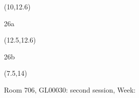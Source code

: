 \documentclass[a4paper]{article}
\newcommand{\myseat}[4]{%
\vspace{-0.1cm}
\parbox[t][2.2cm][t]{3.5cm}{
\small #1 %
\begin{description}
\vspace{-0.1cm}
\item [ID:] #2
\vspace{-0.1cm}
\item [Team:] #3 \normalsize
\vspace{-0.1cm}
\item \normalsize #4
\vspace{-0.1cm}
\end{description}
}
}
\begin{document}
\begin{CJK}{UTF8}{cyberbit}
\begin{textblock}{2.5}(10,12.6)
\textblockcolor{}
\myseat{26a}{}{}{}
\end{textblock}

\begin{textblock}{2.5}(12.5,12.6)
\textblockcolor{}
\myseat{26b}{}{}{}
\end{textblock}

\begin{textblock}{7.5}(7.5,14)
\textblockcolor{}
\parbox[t][2.2cm][t]{9.5cm}{%
\large Room 706, GL00030: second session, Week: 
}
\end{textblock}

\end{CJK}
\end{document}
